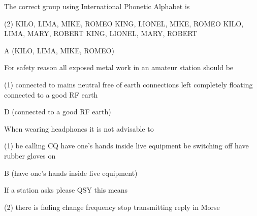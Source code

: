 \documentclass[a4paper]{article}
\begin{document}
\begin{question}The correct group using International Phonetic Alphabet is
	\begin{tasks}(2)
		\task KILO, LIMA, MIKE, ROMEO
		\task KING, LIONEL, MIKE, ROMEO
		\task KILO, LIMA, MARY, ROBERT
		\task KING, LIONEL, MARY, ROBERT
	\end{tasks}
\end{question}

\begin{solution}
	A (KILO, LIMA, MIKE, ROMEO)
\end{solution}

\vspace{5mm}



\begin{question}For safety reason all exposed metal work in an amateur station should be
	\begin{tasks}(1)
		\task connected to mains neutral
		\task free of earth connections
		\task left completely floating
		\task connected to a good RF earth
	\end{tasks}
\end{question}

\begin{solution}
	D (connected to a good RF earth)
\end{solution}

\vspace{5mm}



\begin{question}When wearing headphones it is not advisable to
	\begin{tasks}(1)
		\task be calling CQ
		\task have one's hands inside live equipment
		\task be switching off
		\task have rubber gloves on
	\end{tasks}
\end{question}

\begin{solution}
	B (have one's hands inside live equipment)
\end{solution}

\vspace{5mm}



\begin{question}If a station asks \apostrophe{}please QSY\apostrophe{} this means
	\begin{tasks}(2)
		\task there is fading
		\task change frequency
		\task stop transmitting
		\task reply in Morse
	\end{tasks}
\end{question}
\end{document}
